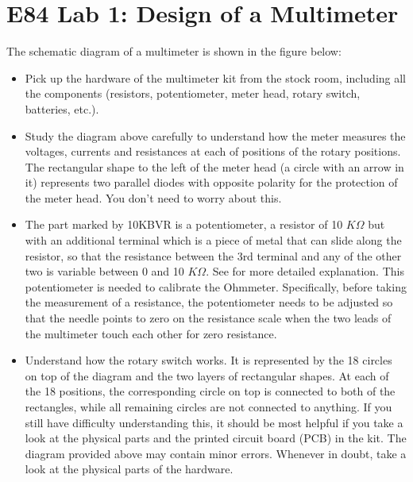 \usepackage{html}
\textwidth 6.0in
\topmargin -0.5in
\oddsidemargin -0in
\evensidemargin -0.5in


\section*{E84 Lab 1: Design of a Multimeter}




The schematic diagram of a multimeter is shown in the figure below:

\begin{itemize}
  \item Pick up the hardware of the multimeter kit from the stock room,
    including all the components (resistors, potentiometer, meter head, 
    rotary switch, batteries, etc.). 

  \item Study the diagram above carefully to understand how the meter 
    measures the voltages, currents and resistances at each of positions 
    of the rotary positions. The rectangular shape to the left of the meter 
    head (a circle with an arrow in it) represents two parallel diodes 
    with opposite polarity for the protection of the meter head. You don't
    need to worry about this. 

  \item The part marked by 10KBVR is a potentiometer, a resistor of 10
    $K\Omega$ but with an additional terminal which is a piece of metal 
    that can slide along the resistor, so that the resistance between the 
    3rd terminal and any of the other two is variable between 0 and 10 
    $K\Omega$. See
    for more detailed explanation. This potentiometer is needed to calibrate
    the Ohmmeter. Specifically, before taking the measurement of a resistance,
    the potentiometer needs to be adjusted so that the needle points to 
    zero on the resistance scale when the two leads of the multimeter touch
    each other for zero resistance.
    
  \item Understand how the rotary switch works. It is represented by the 
    18 circles on top of the diagram and the two layers of rectangular shapes.
    At each of the 18 positions, the corresponding circle on top is connected
    to both of the rectangles, while all remaining circles are not connected
    to anything. If you still have difficulty understanding this, it should
    be most helpful if you take a look at the physical parts and the printed 
    circuit board (PCB) in the kit. The diagram provided above may contain
    minor errors. Whenever in doubt, take a look at the physical parts of
    the hardware.


\end{itemize}

